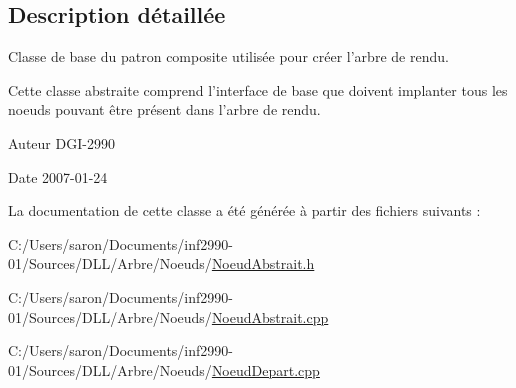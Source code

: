 \subsection{Description détaillée}
Classe de base du patron composite utilisée pour créer l'arbre de rendu. 

Cette classe abstraite comprend l'interface de base que doivent implanter tous les noeuds pouvant être présent dans l'arbre de rendu.

\begin{DoxyAuthor}{Auteur}
D\-G\-I-\/2990 
\end{DoxyAuthor}
\begin{DoxyDate}{Date}
2007-\/01-\/24 
\end{DoxyDate}


La documentation de cette classe a été générée à partir des fichiers suivants \-:\begin{DoxyCompactItemize}
\item 
C\-:/\-Users/saron/\-Documents/inf2990-\/01/\-Sources/\-D\-L\-L/\-Arbre/\-Noeuds/\hyperlink{_noeud_abstrait_8h}{Noeud\-Abstrait.\-h}\item 
C\-:/\-Users/saron/\-Documents/inf2990-\/01/\-Sources/\-D\-L\-L/\-Arbre/\-Noeuds/\hyperlink{_noeud_abstrait_8cpp}{Noeud\-Abstrait.\-cpp}\item 
C\-:/\-Users/saron/\-Documents/inf2990-\/01/\-Sources/\-D\-L\-L/\-Arbre/\-Noeuds/\hyperlink{_noeud_depart_8cpp}{Noeud\-Depart.\-cpp}\end{DoxyCompactItemize}

